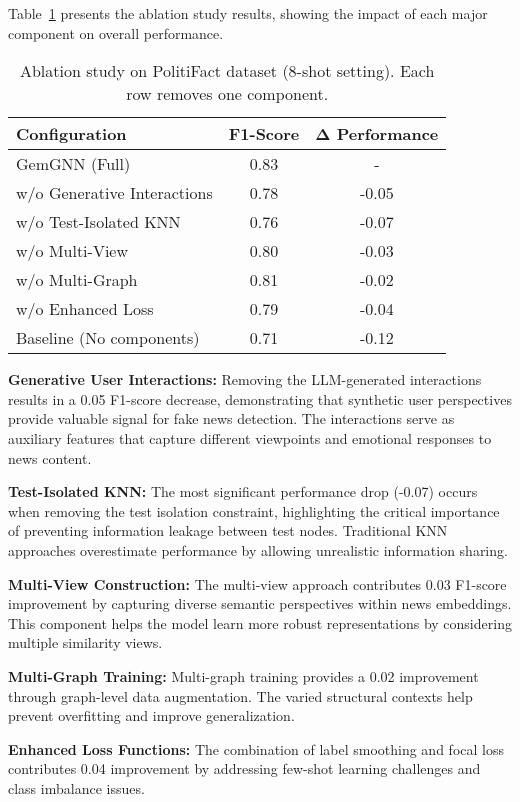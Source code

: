 Table~\ref{tab:ablation:components} presents the ablation study results, showing the impact of each major component on overall performance.

\begin{table}[htbp]
\centering
\caption{Ablation study on PolitiFact dataset (8-shot setting). Each row removes one component.}
\label{tab:ablation:components}
\begin{tabular}{lcc}
\toprule
\textbf{Configuration} & \textbf{F1-Score} & \textbf{Δ Performance} \\
\midrule
GemGNN (Full) & 0.83 & - \\
\midrule
w/o Generative Interactions & 0.78 & -0.05 \\
w/o Test-Isolated KNN & 0.76 & -0.07 \\
w/o Multi-View & 0.80 & -0.03 \\
w/o Multi-Graph & 0.81 & -0.02 \\
w/o Enhanced Loss & 0.79 & -0.04 \\
\midrule
Baseline (No components) & 0.71 & -0.12 \\
\bottomrule
\end{tabular}
\end{table}

\textbf{Generative User Interactions:} Removing the LLM-generated interactions results in a 0.05 F1-score decrease, demonstrating that synthetic user perspectives provide valuable signal for fake news detection. The interactions serve as auxiliary features that capture different viewpoints and emotional responses to news content.

\textbf{Test-Isolated KNN:} The most significant performance drop (-0.07) occurs when removing the test isolation constraint, highlighting the critical importance of preventing information leakage between test nodes. Traditional KNN approaches overestimate performance by allowing unrealistic information sharing.

\textbf{Multi-View Construction:} The multi-view approach contributes 0.03 F1-score improvement by capturing diverse semantic perspectives within news embeddings. This component helps the model learn more robust representations by considering multiple similarity views.

\textbf{Multi-Graph Training:} Multi-graph training provides a 0.02 improvement through graph-level data augmentation. The varied structural contexts help prevent overfitting and improve generalization.

\textbf{Enhanced Loss Functions:} The combination of label smoothing and focal loss contributes 0.04 improvement by addressing few-shot learning challenges and class imbalance issues.

